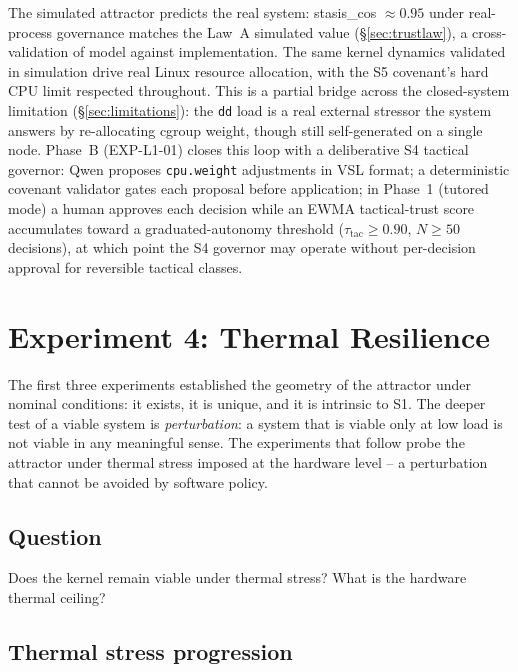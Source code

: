 \documentclass[11pt, a4paper]{article}
\begin{document}
The simulated attractor predicts the real system: stasis\_cos $\approx 0.95$ under
real-process governance matches the Law~A simulated value (\S\ref{sec:trustlaw}),
a cross-validation of model against implementation.  The same kernel dynamics
validated in simulation drive real Linux resource allocation, with the S5
covenant's hard CPU limit respected throughout.  This is a partial bridge across
the closed-system limitation (\S\ref{sec:limitations}): the \texttt{dd} load is a
real external stressor the system answers by re-allocating cgroup weight, though
still self-generated on a single node.
Phase~B (EXP-L1-01) closes this loop with a deliberative S4 tactical governor:
Qwen proposes \texttt{cpu.weight} adjustments in VSL format; a deterministic
covenant validator gates each proposal before application; in Phase~1 (tutored
mode) a human approves each decision while an EWMA tactical-trust score
accumulates toward a graduated-autonomy threshold
($\tau_\text{tac} \geq 0.90$, $N \geq 50$ decisions), at which point the S4
governor may operate without per-decision approval for reversible tactical classes.


\section{Experiment 4: Thermal Resilience}
\label{sec:thermal}

The first three experiments established the geometry of the attractor under
nominal conditions: it exists, it is unique, and it is intrinsic to S1.
The deeper test of a viable system is \emph{perturbation}: a system that
is viable only at low load is not viable in any meaningful sense.
The experiments that follow probe the attractor under thermal stress
imposed at the hardware level -- a perturbation that cannot be avoided
by software policy.

\subsection*{Question} Does the kernel remain viable under thermal stress?
What is the hardware thermal ceiling?

\subsection{Thermal stress progression}
\end{document}
